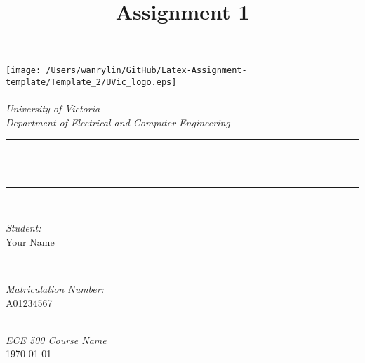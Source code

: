 \documentclass[12pt]{article}
\title{Assignment 1}
\begin{document}
	
	\begin{titlepage}
		\newcommand{\HRule}{\rule{\linewidth}{0.5mm}}
		\texttt{[image: /Users/wanrylin/GitHub/Latex-Assignment-template/Template\_2/UVic\_logo.eps]}\\[1cm] 
		\centering
		\quad\\[1.5cm]
		\textsl{\Large University of Victoria }\\[0.5cm] 
		\textsl{\large Department of Electrical and Computer Engineering}\\[0.5cm] 
		\makeatletter
		\HRule \\[0.4cm]
		{ \huge \bfseries \@title}\\[0.4cm] 
		\HRule \\[1.5cm]
		\begin{minipage}{0.4\textwidth}
			\begin{flushleft} \large
				\emph{Student:}\\
				\textup{Your Name}
			\end{flushleft}
		\end{minipage}
		~
		\begin{minipage}{0.4\textwidth}
			\begin{flushright} \large
				\emph{Matriculation Number:} \\
				\textup{A01234567}
			\end{flushright}
		\end{minipage}\\[3cm]
		\makeatother
		{\large \emph{ECE 500 Course Name}}\\[0.5cm]
		{\large \today}\\[2cm] 
		\vfill 
	\end{titlepage}
\end{document}

